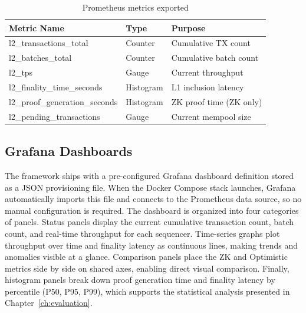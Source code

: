 \begin{table}[h]
    \centering
    \begin{tabular}{p{4cm}|p{3cm}|p{3cm}}
        \hline
        \textbf{Metric Name} & \textbf{Type} & \textbf{Purpose} \\
        \hline
        l2\_transactions\_total & Counter & Cumulative TX count \\
        \hline
        l2\_batches\_total & Counter & Cumulative batch count \\
        \hline
        l2\_tps & Gauge & Current throughput \\
        \hline
        l2\_finality\_time\_seconds & Histogram & L1 inclusion latency \\
        \hline
        l2\_proof\_generation\_seconds & Histogram & ZK proof time (ZK only) \\
        \hline
        l2\_pending\_transactions & Gauge & Current mempool size \\
        \hline
    \end{tabular}
    \caption{Prometheus metrics exported}
    \label{tab:prometheus-metrics}
\end{table}

\subsection{Grafana Dashboards}

The framework ships with a pre-configured Grafana dashboard definition stored as a JSON provisioning file. When the Docker Compose stack launches, Grafana automatically imports this file and connects to the Prometheus data source, so no manual configuration is required. The dashboard is organized into four categories of panels. Status panels display the current cumulative transaction count, batch count, and real-time throughput for each sequencer. Time-series graphs plot throughput over time and finality latency as continuous lines, making trends and anomalies visible at a glance. Comparison panels place the ZK and Optimistic metrics side by side on shared axes, enabling direct visual comparison. Finally, histogram panels break down proof generation time and finality latency by percentile (P50, P95, P99), which supports the statistical analysis presented in Chapter~\ref{ch:evaluation}.
